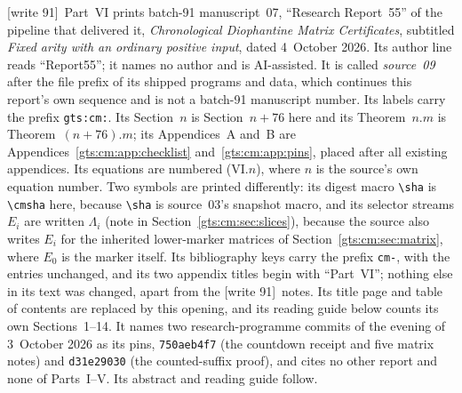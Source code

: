 \documentclass[11pt,letterpaper]{article}
\theoremstyle{definition}
\theoremstyle{remark}
\newcommand{\sha}{\texttt{c58206ca101d4744a015a0f0104646109357d943}}
\newcommand{\cmsha}[1]{\par\noindent{\footnotesize\ttfamily\seqsplit{#1}}\par}
\newcommand{\wtagd}{\textup{[write 91]}}
\begin{document}
\noindent\wtagd\ Part~VI prints batch-91 manuscript~07, ``Research Report~55'' of the pipeline that delivered it, \emph{Chronological Diophantine Matrix Certificates}, subtitled \emph{Fixed arity with an ordinary positive input}, dated 4~October 2026. Its author line reads ``Report55''; it names no author and is AI-assisted. It is called \emph{source~09} after the file prefix of its shipped programs and data, which continues this report's own sequence and is not a batch-91 manuscript number. Its labels carry the prefix \texttt{gts:cm:}. Its Section~$n$ is Section~$n+76$ here and its Theorem~$n.m$ is Theorem~$(n+76).m$; its Appendices~A and~B are Appendices~\ref{gts:cm:app:checklist} and~\ref{gts:cm:app:pins}, placed after all existing appendices. Its equations are numbered (VI.$n$), where $n$ is the source's own equation number. Two symbols are printed differently: its digest macro \verb|\sha| is \verb|\cmsha| here, because \verb|\sha| is source~03's snapshot macro, and its selector streams $E_i$ are written $\Lambda_i$ (note in Section~\ref{gts:cm:sec:slices}), because the source also writes $E_i$ for the inherited lower-marker matrices of Section~\ref{gts:cm:sec:matrix}, where $E_0$ is the marker itself. Its bibliography keys carry the prefix \texttt{cm-}, with the entries unchanged, and its two appendix titles begin with ``Part~VI''; nothing else in its text was changed, apart from the \wtagd\ notes. Its title page and table of contents are replaced by this opening, and its reading guide below counts its own Sections~1--14. It names two research-programme commits of the evening of 3~October 2026 as its pins, \texttt{750aeb4f7} (the countdown receipt and five matrix notes) and \texttt{d31e29030} (the counted-suffix proof), and cites no other report and none of Parts~I--V. Its abstract and reading guide follow.
\end{document}
